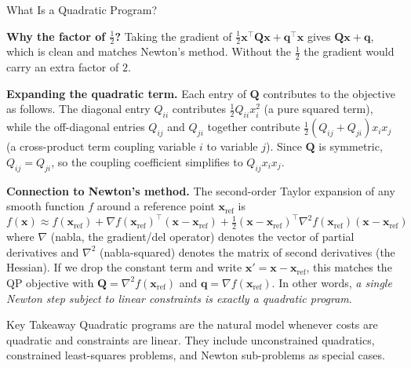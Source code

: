 \documentclass[aspectratio=169,10pt]{beamer}
\newcommand{\bx}{\mathbf{x}}
\newcommand{\bq}{\mathbf{q}}
\newcommand{\bQ}{\mathbf{Q}}
\begin{document}
\begin{frame}[allowframebreaks]{What Is a Quadratic Program?}
  \framebreak

  \textbf{Why the factor of $\tfrac{1}{2}$?}  Taking the gradient of
  $\tfrac{1}{2}\bx^{\top}\bQ\bx + \bq^{\top}\bx$ gives $\bQ\bx + \bq$, which is
  clean and matches Newton's method.  Without the $\tfrac{1}{2}$ the gradient would
  carry an extra factor of $2$.

  \textbf{Expanding the quadratic term.}  Each entry of $\bQ$ contributes to the
  objective as follows.  The diagonal entry $Q_{ii}$ contributes
  $\tfrac{1}{2}Q_{ii}x_i^2$ (a pure squared term), while the off-diagonal entries
  $Q_{ij}$ and $Q_{ji}$ together contribute
  $\tfrac{1}{2}(Q_{ij}+Q_{ji})x_ix_j$ (a cross-product term coupling variable $i$ to
  variable $j$).  Since $\bQ$ is symmetric, $Q_{ij} = Q_{ji}$, so the coupling
  coefficient simplifies to $Q_{ij}x_ix_j$.

  \textbf{Connection to Newton's method.}  The second-order Taylor expansion of any
  smooth function $f$ around a reference point $\bx_{\text{ref}}$ is
  \[
    f(\bx) \approx f(\bx_{\text{ref}})
      + \nabla f(\bx_{\text{ref}})^{\top}(\bx - \bx_{\text{ref}})
      + \tfrac{1}{2}(\bx-\bx_{\text{ref}})^{\top}\nabla^2 f(\bx_{\text{ref}})(\bx-\bx_{\text{ref}})
  \]
  where $\nabla$ (nabla, the gradient/del operator) denotes the vector of partial
  derivatives and $\nabla^2$ (nabla-squared) denotes the matrix of second derivatives
  (the Hessian).  If we drop the constant term and write $\bx' = \bx - \bx_{\text{ref}}$,
  this matches the QP objective with $\bQ = \nabla^2 f(\bx_{\text{ref}})$ and
  $\bq = \nabla f(\bx_{\text{ref}})$.  In other words, \emph{a single Newton step
  subject to linear constraints is exactly a quadratic program}.

  \begin{alertblock}{Key Takeaway}
    Quadratic programs are the natural model whenever costs are quadratic and
    constraints are linear.  They include unconstrained quadratics, constrained
    least-squares problems, and Newton sub-problems as special cases.
  \end{alertblock}

\end{frame}
\end{document}
